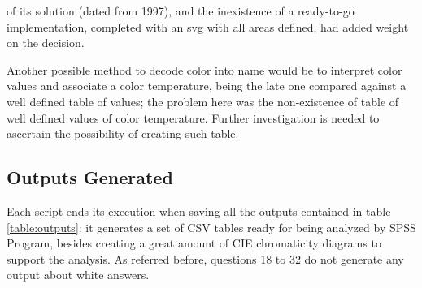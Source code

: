 of its solution (dated from 1997), and the inexistence of a ready-to-go implementation, completed with an svg with all areas defined, had added weight on the decision. \par
%
Another possible method to decode color into name would be to interpret color values and associate a color temperature, being the late one compared against a well defined table
of values; the problem here was the non-existence of table of well defined values of color temperature. Further investigation is needed to ascertain the possibility of creating such
table. \par
%
\subsection{Outputs Generated}
\label{subsec:results_outputsgenerated}
%
Each script ends its execution when saving all the outputs contained in table \ref{table:outputs}: it generates a set of \gls{CSV} tables ready for being analyzed by
SPSS Program, besides creating a great amount of CIE chromaticity diagrams to support the analysis. As referred before, questions 18 to 32 do not generate any output about
white answers. \par
%
